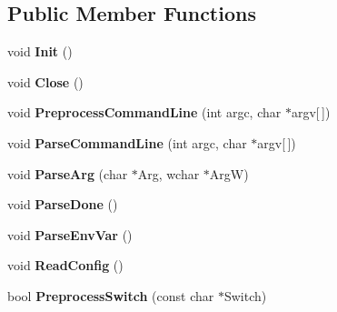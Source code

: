 \subsection*{Public Member Functions}
\begin{DoxyCompactItemize}
\item 
\hypertarget{class_command_data_ad63d5695cbc3d8aec1795cd4d258e47e}{void {\bfseries Init} ()}\label{class_command_data_ad63d5695cbc3d8aec1795cd4d258e47e}

\item 
\hypertarget{class_command_data_a3b7758bea130948a31e5fa70c07d0006}{void {\bfseries Close} ()}\label{class_command_data_a3b7758bea130948a31e5fa70c07d0006}

\item 
\hypertarget{class_command_data_a0547939cdb4f52fc7acf6cb260021d87}{void {\bfseries Preprocess\-Command\-Line} (int argc, char $\ast$argv\mbox{[}$\,$\mbox{]})}\label{class_command_data_a0547939cdb4f52fc7acf6cb260021d87}

\item 
\hypertarget{class_command_data_ab984187a6f60d79d5dd0277b890945b0}{void {\bfseries Parse\-Command\-Line} (int argc, char $\ast$argv\mbox{[}$\,$\mbox{]})}\label{class_command_data_ab984187a6f60d79d5dd0277b890945b0}

\item 
\hypertarget{class_command_data_adce9f02e44d1ef88a4414ffa850cb63e}{void {\bfseries Parse\-Arg} (char $\ast$Arg, wchar $\ast$Arg\-W)}\label{class_command_data_adce9f02e44d1ef88a4414ffa850cb63e}

\item 
\hypertarget{class_command_data_ad70249d7eac21f97d90156503fbd9ade}{void {\bfseries Parse\-Done} ()}\label{class_command_data_ad70249d7eac21f97d90156503fbd9ade}

\item 
\hypertarget{class_command_data_ac57a44878f6473a9a0a3cc2ee8e5a467}{void {\bfseries Parse\-Env\-Var} ()}\label{class_command_data_ac57a44878f6473a9a0a3cc2ee8e5a467}

\item 
\hypertarget{class_command_data_a037030ad1b69ae743ace05bc4c427ecc}{void {\bfseries Read\-Config} ()}\label{class_command_data_a037030ad1b69ae743ace05bc4c427ecc}

\item 
\hypertarget{class_command_data_ab4927ff8058e589a2906fbb78e271c98}{bool {\bfseries Preprocess\-Switch} (const char $\ast$Switch)}\label{class_command_data_ab4927ff8058e589a2906fbb78e271c98}


\end{DoxyCompactItemize}
